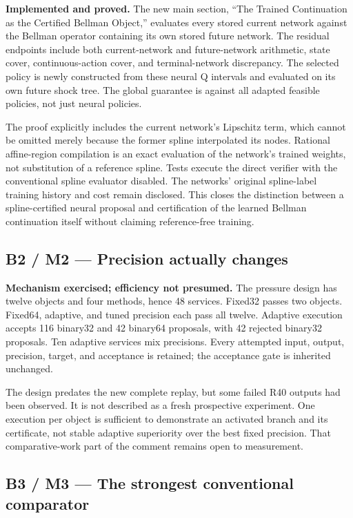 \documentclass[
  11pt,
]{article}
\begin{document}
\textbf{Implemented and proved.} The new main section, ``The Trained
Continuation as the Certified Bellman Object,'' evaluates every stored
current network against the Bellman operator containing its own stored
future network. The residual endpoints include both current-network and
future-network arithmetic, state cover, continuous-action cover, and
terminal-network discrepancy. The selected policy is newly constructed
from these neural Q intervals and evaluated on its own future shock
tree. The global guarantee is against all adapted feasible policies, not
just neural policies.

The proof explicitly includes the current network's Lipschitz term,
which cannot be omitted merely because the former spline interpolated
its nodes. Rational affine-region compilation is an exact evaluation of
the network's trained weights, not substitution of a reference spline.
Tests execute the direct verifier with the conventional spline evaluator
disabled. The networks' original spline-label training history and cost
remain disclosed. This closes the distinction between a spline-certified
neural proposal and certification of the learned Bellman continuation
itself without claiming reference-free training.

\hypertarget{b2-m2-precision-actually-changes}{%
\subsection{B2 / M2 --- Precision actually
changes}\label{b2-m2-precision-actually-changes}}

\textbf{Mechanism exercised; efficiency not presumed.} The pressure
design has twelve objects and four methods, hence 48 services. Fixed32
passes two objects. Fixed64, adaptive, and tuned precision each pass all
twelve. Adaptive execution accepts 116 binary32 and 42 binary64
proposals, with 42 rejected binary32 proposals. Ten adaptive services
mix precisions. Every attempted input, output, precision, target, and
acceptance is retained; the acceptance gate is inherited unchanged.

The design predates the new complete replay, but some failed R40 outputs
had been observed. It is not described as a fresh prospective
experiment. One execution per object is sufficient to demonstrate an
activated branch and its certificate, not stable adaptive superiority
over the best fixed precision. That comparative-work part of the comment
remains open to measurement.

\hypertarget{b3-m3-the-strongest-conventional-comparator}{%
\subsection{B3 / M3 --- The strongest conventional
comparator}\label{b3-m3-the-strongest-conventional-comparator}}
\end{document}
